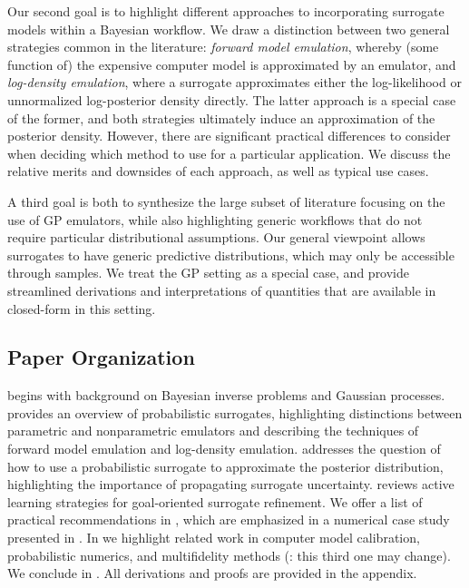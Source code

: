 \documentclass[12pt]{article}
\begin{document}
Our second goal is to highlight different approaches to incorporating surrogate models within a Bayesian
workflow. We draw a distinction between two general strategies common in the literature:
\textit{forward model emulation}, whereby (some function of) the expensive computer model is approximated 
by an emulator, and \textit{log-density emulation}, 
where a surrogate approximates either the log-likelihood or unnormalized log-posterior density directly. 
The latter approach is a special case of the former, and both strategies ultimately induce an 
approximation of the posterior density. However, there are significant practical differences to consider
when deciding which method to use for a particular application.  
We discuss the relative merits and downsides of each approach, as well as typical use cases.

A third goal is both to synthesize the large subset of literature focusing on the use of GP emulators, 
while also highlighting generic workflows that do not require particular distributional assumptions.
Our general viewpoint allows surrogates to have generic predictive distributions, which may only
be accessible through samples. We treat the GP setting as a special case, and provide streamlined 
derivations and interpretations of quantities that are available in closed-form in this setting.

\subsection{Paper Organization}
 begins with background on Bayesian inverse problems and Gaussian processes.
 provides an overview of probabilistic surrogates, highlighting distinctions
between parametric and nonparametric emulators and describing the techniques of forward model 
emulation and log-density emulation.  addresses the question of how to 
use a probabilistic surrogate to approximate the posterior distribution, highlighting the importance
of propagating surrogate uncertainty.  reviews active learning strategies for 
goal-oriented surrogate refinement. We offer a list of practical recommendations in ,
which are emphasized in a numerical case study presented in .
In  we highlight related work in computer model calibration, probabilistic numerics,
and multifidelity methods (\todo: this third one may change). We conclude in . 
All derivations and proofs are provided in the appendix.
\end{document}
